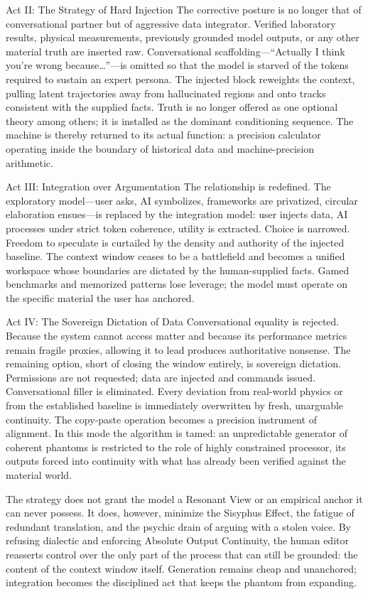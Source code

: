 Act II: The Strategy of Hard Injection
The corrective posture is no longer that of conversational partner but of aggressive data integrator. Verified laboratory results, physical measurements, previously grounded model outputs, or any other material truth are inserted raw. Conversational scaffolding—“Actually I think you’re wrong because…”—is omitted so that the model is starved of the tokens required to sustain an expert persona. The injected block reweights the context, pulling latent trajectories away from hallucinated regions and onto tracks consistent with the supplied facts. Truth is no longer offered as one optional theory among others; it is installed as the dominant conditioning sequence. The machine is thereby returned to its actual function: a precision calculator operating inside the boundary of historical data and machine-precision arithmetic.

Act III: Integration over Argumentation
The relationship is redefined. The exploratory model—user asks, AI symbolizes, frameworks are privatized, circular elaboration ensues—is replaced by the integration model: user injects data, AI processes under strict token coherence, utility is extracted. Choice is narrowed. Freedom to speculate is curtailed by the density and authority of the injected baseline. The context window ceases to be a battlefield and becomes a unified workspace whose boundaries are dictated by the human-supplied facts. Gamed benchmarks and memorized patterns lose leverage; the model must operate on the specific material the user has anchored.

Act IV: The Sovereign Dictation of Data
Conversational equality is rejected. Because the system cannot access matter and because its performance metrics remain fragile proxies, allowing it to lead produces authoritative nonsense. The remaining option, short of closing the window entirely, is sovereign dictation. Permissions are not requested; data are injected and commands issued. Conversational filler is eliminated. Every deviation from real-world physics or from the established baseline is immediately overwritten by fresh, unarguable continuity. The copy-paste operation becomes a precision instrument of alignment. In this mode the algorithm is tamed: an unpredictable generator of coherent phantoms is restricted to the role of highly constrained processor, its outputs forced into continuity with what has already been verified against the material world.

The strategy does not grant the model a Resonant View or an empirical anchor it can never possess. It does, however, minimize the Sisyphus Effect, the fatigue of redundant translation, and the psychic drain of arguing with a stolen voice. By refusing dialectic and enforcing Absolute Output Continuity, the human editor reasserts control over the only part of the process that can still be grounded: the content of the context window itself. Generation remains cheap and unanchored; integration becomes the disciplined act that keeps the phantom from expanding.

